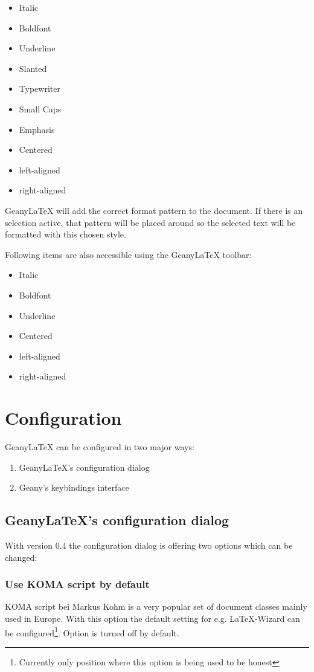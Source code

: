 \documentclass[%
a4paper,%
10pt,%
oneside,%
DIV18,
headsepline,
plainheadsepline,
footsepline,
plainfootsepline,
bibtotoc,%
liststotoc,%
BCOR12mm,%
halfparskip,%
openany,%
]{scrartcl}
\begin{document}
\begin{itemize}
	\item Italic
	\item Boldfont
	\item Underline
	\item Slanted
	\item Typewriter
	\item Small Caps
	\item Emphasis
	\item Centered
	\item left-aligned
	\item right-aligned
\end{itemize}

Geany\LaTeX{} will add the correct format pattern to the document. If
there is an selection active, that pattern will be placed around so
the selected text will be formatted with this chosen style.

Following items are also accessible using the Geany\LaTeX{} toolbar:
\begin{itemize}
	\item Italic
	\item Boldfont
	\item Underline
	\item Centered
	\item left-aligned
	\item right-aligned
\end{itemize}

\section{Configuration}

GeanyLaTeX{} can be configured in two major ways:
\begin{enumerate}
\item GeanyLaTeX{}'s configuration dialog
\item Geany's keybindings interface
\end{enumerate}

\subsection{GeanyLaTeX{}'s configuration dialog}
With version 0.4 the configuration dialog is offering two options which
can be changed:

\subsubsection{Use KOMA script by default}
KOMA script bei Markus Kohm is a very popular set of document classes
mainly used in Europe. With this option the default setting for e.g.
\LaTeX{}-Wizard can be configured\footnote{Currently only position where
this option is being used to be honest}. Option is turned off by default.
\end{document}
